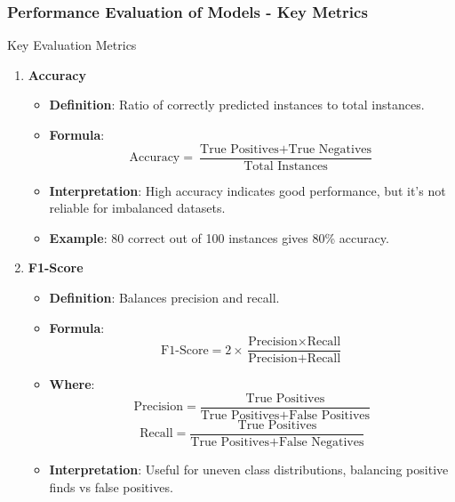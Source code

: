 \documentclass[aspectratio=169]{beamer}
\begin{document}
\begin{frame}[fragile]
    \frametitle{Performance Evaluation of Models - Key Metrics}
    \begin{block}{Key Evaluation Metrics}
        \begin{enumerate}
            \item \textbf{Accuracy}
            \begin{itemize}
                \item \textbf{Definition}: Ratio of correctly predicted instances to total instances.
                \item \textbf{Formula}:
                \begin{equation}
                \text{Accuracy} = \frac{\text{True Positives} + \text{True Negatives}}{\text{Total Instances}}
                \end{equation}
                \item \textbf{Interpretation}: High accuracy indicates good performance, but it's not reliable for imbalanced datasets.
                \item \textbf{Example}: 80 correct out of 100 instances gives 80\% accuracy.
            \end{itemize}

            \item \textbf{F1-Score}
            \begin{itemize}
                \item \textbf{Definition}: Balances precision and recall.
                \item \textbf{Formula}:
                \begin{equation}
                \text{F1-Score} = 2 \times \frac{\text{Precision} \times \text{Recall}}{\text{Precision} + \text{Recall}}
                \end{equation}
                \item \textbf{Where}:
                \begin{equation}
                \text{Precision} = \frac{\text{True Positives}}{\text{True Positives} + \text{False Positives}}
                \end{equation}
                \begin{equation}
                \text{Recall} = \frac{\text{True Positives}}{\text{True Positives} + \text{False Negatives}}
                \end{equation}
                \item \textbf{Interpretation}: Useful for uneven class distributions, balancing positive finds vs false positives.
            \end{itemize}
        \end{enumerate}
    \end{block}
\end{frame}
\end{document}
